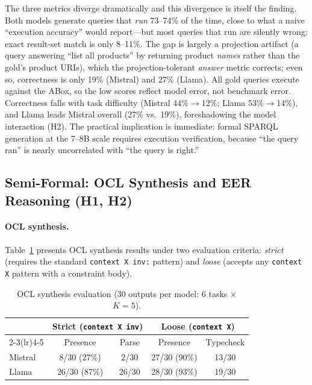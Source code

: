\documentclass[runningheads]{llncs}
\begin{document}
The three metrics diverge dramatically and this divergence is itself the finding. Both models generate queries that \emph{run} 73--74\% of the time, close to what a naive ``execution accuracy'' would report---but most queries that run are silently wrong: exact result-set match is only 8--11\%. The gap is largely a projection artifact (a query answering ``list all products'' by returning product \emph{names} rather than the gold's product URIs), which the projection-tolerant \emph{answer} metric corrects; even so, correctness is only 19\% (Mistral) and 27\% (Llama). All gold queries execute against the ABox, so the low scores reflect model error, not benchmark error. Correctness falls with task difficulty (Mistral 44\%$\to$12\%; Llama 53\%$\to$14\%), and Llama leads Mistral overall (27\% vs.\ 19\%), foreshadowing the model interaction (H2). The practical implication is immediate: formal SPARQL generation at the 7--8B scale requires execution verification, because ``the query ran'' is nearly uncorrelated with ``the query is right.''

\subsection{Semi-Formal: OCL Synthesis and EER Reasoning (H1, H2)}

\paragraph{OCL synthesis.}
Table~\ref{tab:ocl} presents OCL synthesis results under two evaluation criteria: \emph{strict} (requires the standard \texttt{context X inv:} pattern) and \emph{loose} (accepts any \texttt{context X} pattern with a constraint body).

\begin{table}[h]
\centering
\caption{OCL synthesis evaluation (30 outputs per model: 6 tasks $\times$ $K\!=\!5$).}
\label{tab:ocl}
\begin{tabular}{lcccc}
\toprule
& \multicolumn{2}{c}{Strict (\texttt{context X inv})} & \multicolumn{2}{c}{Loose (\texttt{context X})} \\
\cmidrule(lr){2-3}\cmidrule(lr){4-5}
& Presence & Parse & Presence & Typecheck \\
\midrule
Mistral & 8/30 (27\%) & 2/30 & 27/30 (90\%) & 13/30 \\
Llama   & 26/30 (87\%) & 26/30 & 28/30 (93\%) & 19/30 \\
\bottomrule
\end{tabular}
\end{table}
\end{document}
